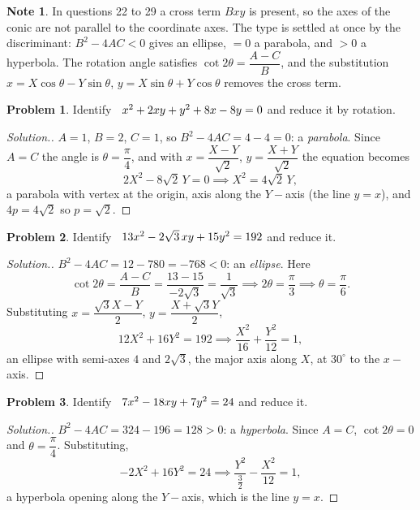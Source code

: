 \documentclass[11pt,a4paper]{article}
\theoremstyle{definition}
\newtheorem*{note}{Note}
\newtheorem{problemx}{Problem}[subsection]
\newenvironment{problem}{\begin{problemx}}{\end{problemx}}
\newenvironment{solution}
  {\renewcommand{\qedsymbol}{}\begin{proof}[\textit{Solution}.]}
  {\end{proof}}
\begin{document}
\begin{note}
In questions 22 to 29 a cross term $Bxy$ is present, so the axes of the conic are
not parallel to the coordinate axes. The type is settled at once by the
discriminant: $B^2 - 4AC < 0$ gives an ellipse, $= 0$ a parabola, and $>0$ a
hyperbola. The rotation angle satisfies
$\cot 2\theta = \dfrac{A-C}{B}$, and the substitution
$x = X\cos\theta - Y\sin\theta$, $y = X\sin\theta + Y\cos\theta$ removes the
cross term.
\end{note}

\begin{problem}
Identify $\hspace{0.2cm} x^2 + 2xy + y^2 + 8x - 8y = 0$ and reduce it by
rotation.
\end{problem}
\begin{solution}
$A = 1$, $B = 2$, $C = 1$, so $B^2 - 4AC = 4 - 4 = 0$: a \emph{parabola}. Since
$A = C$ the angle is $\theta = \dfrac{\pi}{4}$, and with
$x = \dfrac{X-Y}{\sqrt2}$, $y = \dfrac{X+Y}{\sqrt2}$ the equation becomes
$$2X^2 - 8\sqrt2\,Y = 0 \implies X^2 = 4\sqrt2\,Y ,$$
a parabola with vertex at the origin, axis along the $Y-$axis (the line
$y = x$), and $4p = 4\sqrt2$ so $p = \sqrt2$.
\end{solution}

\begin{problem}
Identify $\hspace{0.2cm} 13x^2 - 2\sqrt3\,xy + 15y^2 = 192$ and reduce it.
\end{problem}
\begin{solution}
$B^2 - 4AC = 12 - 780 = -768 < 0$: an \emph{ellipse}. Here
$$\cot 2\theta = \frac{A-C}{B} = \frac{13-15}{-2\sqrt3} = \frac{1}{\sqrt3}
\implies 2\theta = \frac{\pi}{3} \implies \theta = \frac{\pi}{6}.$$
Substituting $x = \dfrac{\sqrt3 X - Y}{2}$, $y = \dfrac{X + \sqrt3 Y}{2}$,
$$12X^2 + 16Y^2 = 192 \implies \frac{X^2}{16} + \frac{Y^2}{12} = 1 ,$$
an ellipse with semi-axes $4$ and $2\sqrt3$, the major axis along $X$, at
$30^{\circ}$ to the $x-$axis.
\end{solution}

\begin{problem}
Identify $\hspace{0.2cm} 7x^2 - 18xy + 7y^2 = 24$ and reduce it.
\end{problem}
\begin{solution}
$B^2 - 4AC = 324 - 196 = 128 > 0$: a \emph{hyperbola}. Since $A = C$,
$\cot 2\theta = 0$ and $\theta = \dfrac{\pi}{4}$. Substituting,
$$-2X^2 + 16Y^2 = 24 \implies \frac{Y^2}{\frac{3}{2}} - \frac{X^2}{12} = 1 ,$$
a hyperbola opening along the $Y-$axis, which is the line $y = x$.
\end{solution}
\end{document}
